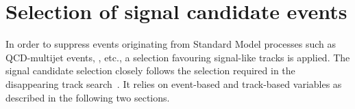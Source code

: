 \section{Selection of signal candidate events}
\label{sec:AnalysisSelection}

In order to suppress events originating from Standard Model processes such as QCD-multijet events, \WJets, etc., a selection favouring signal-like tracks is applied.
The signal candidate selection closely follows the selection required in the disappearing track search~\cite{bib:CMS:DT_Thesis,bib:CMS:DT_8TeV_AN}.
It relies on event-based and track-based variables as described in the following two sections.


